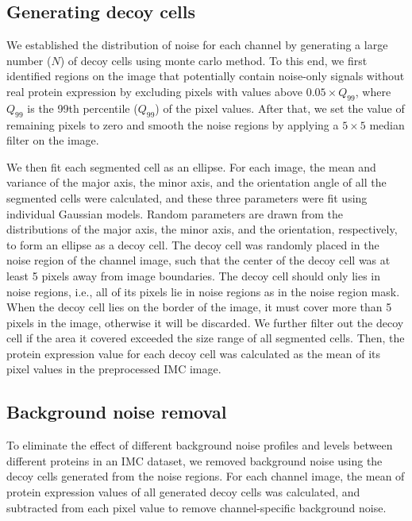 \documentclass{mynature}
\begin{document}
\subsection{Generating decoy cells}

We established the distribution of noise for each channel by generating a large number ($N$) of decoy cells using monte carlo method.  
To this end, we first identified regions on the image that potentially contain noise-only signals without real protein expression by excluding pixels with values above $0.05\times Q_{99}$, where $Q_{99}$ is the 99th percentile ($Q_{99}$) of the pixel values.  
After that, we set the value of remaining pixels to zero and smooth the noise regions by applying a $5\times 5$ median filter on the image.  

We then fit each segmented cell as an ellipse. For each image, the mean and variance of the major axis, the minor axis, and the orientation angle of all the segmented cells were calculated, and these three parameters were fit using individual Gaussian models. 
Random parameters are drawn from the distributions of the major axis, the minor axis, and the orientation, respectively, to form an ellipse as a decoy cell. 
The decoy cell was randomly placed in the noise region of the channel image, such that the center of the decoy cell was at least 5 pixels away from image boundaries. 
The decoy cell should only lies in noise regions, i.e., all of its pixels lie in noise regions as in the noise region mask. 
When the decoy cell lies on the border of the image, it must cover more than 5 pixels in the image, otherwise it will be discarded. 
We further filter out the decoy cell if the area it covered exceeded the size range of all segmented cells. 
Then, the protein expression value for each decoy cell was calculated as the mean of its pixel values in the preprocessed IMC image. %

\subsection{Background noise removal}

To eliminate the effect of different background noise profiles and levels between different proteins in an IMC dataset, we removed background noise using the decoy cells generated from the noise regions. 
For each channel image, the mean of protein expression values of all generated decoy cells was calculated, and subtracted from 
each pixel value 
to remove channel-specific background noise. 
\end{document}
